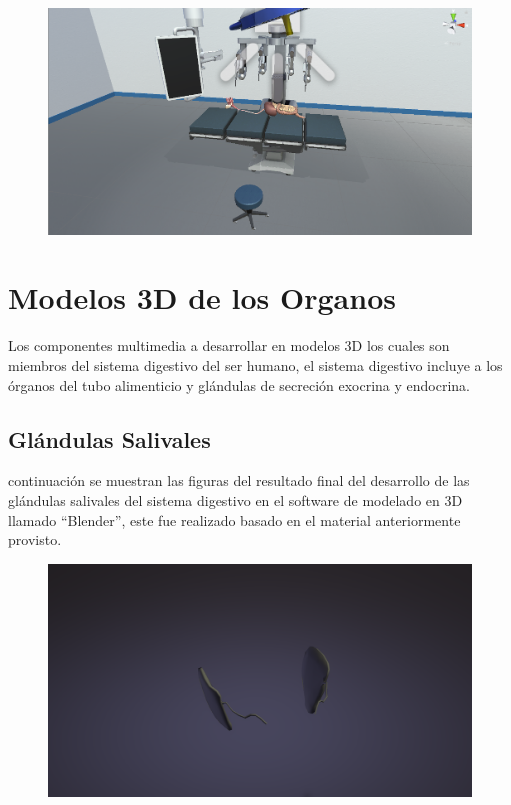\begin{figure}[H]
	\begin{center}
 		\includegraphics[width = .5\textwidth]{source/images/image16.png}
	\end{center} 
\end{figure}

\section{Modelos 3D de los Organos}
Los componentes multimedia a desarrollar en modelos 3D los cuales son miembros del sistema digestivo del ser humano, 
el sistema digestivo incluye a los órganos del tubo alimenticio y glándulas de secreción exocrina y endocrina.\\

\subsection{Glándulas Salivales}
 continuación se muestran las figuras del resultado final del desarrollo de las glándulas salivales del sistema digestivo 
 en el software de modelado en 3D llamado “Blender”, este fue realizado basado en el material anteriormente provisto.\\
\begin{figure}[H]
	\begin{center}
 		\includegraphics[width = .5\textwidth]{source/images/image41.png}
	\end{center} 
\end{figure}

